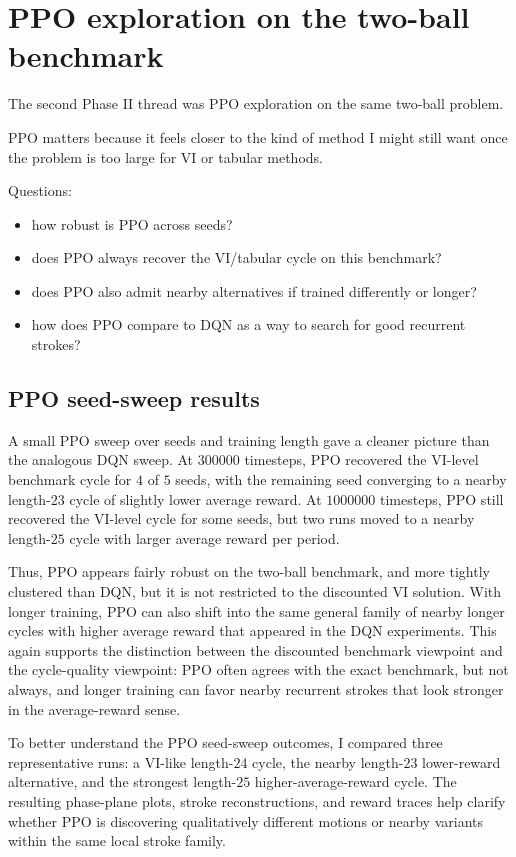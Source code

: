 \documentclass{article}
\begin{document}
\section{PPO exploration on the two-ball benchmark}

The second Phase II thread was PPO exploration on the same two-ball problem.

PPO matters because it feels closer to the kind of method I might still want once the problem is too large for VI or tabular methods.

Questions:
\begin{itemize}
    \item how robust is PPO across seeds?
    \item does PPO always recover the VI/tabular cycle on this benchmark?
    \item does PPO also admit nearby alternatives if trained differently or longer?
    \item how does PPO compare to DQN as a way to search for good recurrent strokes?
\end{itemize}

\subsection*{PPO seed-sweep results}

A small PPO sweep over seeds and training length gave a cleaner picture than the analogous DQN sweep. At $300000$ timesteps, PPO recovered the VI-level benchmark cycle for $4$ of $5$ seeds, with the remaining seed converging to a nearby length-$23$ cycle of slightly lower average reward. At $1000000$ timesteps, PPO still recovered the VI-level cycle for some seeds, but two runs moved to a nearby length-$25$ cycle with larger average reward per period.

Thus, PPO appears fairly robust on the two-ball benchmark, and more tightly clustered than DQN, but it is not restricted to the discounted VI solution. With longer training, PPO can also shift into the same general family of nearby longer cycles with higher average reward that appeared in the DQN experiments. This again supports the distinction between the discounted benchmark viewpoint and the cycle-quality viewpoint: PPO often agrees with the exact benchmark, but not always, and longer training can favor nearby recurrent strokes that look stronger in the average-reward sense.

To better understand the PPO seed-sweep outcomes, I compared three representative runs: a VI-like length-$24$ cycle, the nearby length-$23$ lower-reward alternative, and the strongest length-$25$ higher-average-reward cycle. The resulting phase-plane plots, stroke reconstructions, and reward traces help clarify whether PPO is discovering qualitatively different motions or nearby variants within the same local stroke family.
\end{document}
